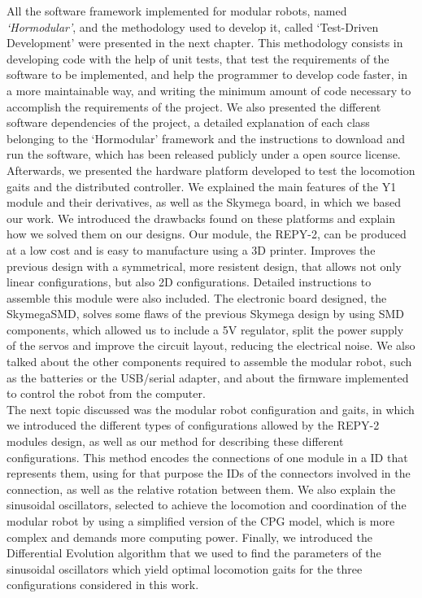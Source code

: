 All the software framework implemented for modular robots, named \emph{`Hormodular'}, and the methodology used to develop it, called `Test-Driven Development' were presented in the next chapter. This methodology consists in developing code with the help of unit tests, that test the requirements of the software to be implemented, and help the programmer to develop code faster, in a more maintainable way, and writing the minimum amount of code necessary to accomplish the requirements of the project. We also presented the different software dependencies of the project, a detailed explanation of each class belonging to the `Hormodular' framework and the instructions to download and run the software, which has been released publicly under a open source license.\\

Afterwards, we presented the hardware platform developed to test the locomotion gaits and the distributed controller. We explained the main features of the Y1 module and their derivatives, as well as the Skymega board, in which we based our work. We introduced the drawbacks found on these platforms and explain how we solved them on our designs. Our module, the REPY-2, can be produced at a low cost and is easy to manufacture using a 3D printer. Improves the previous design with a symmetrical, more resistent design, that allows not only linear configurations, but also 2D configurations. Detailed instructions to assemble this module were also included. The electronic board designed, the SkymegaSMD, solves some flaws of the previous Skymega design by using SMD components, which allowed us to include a 5V regulator, split the power supply of the servos and improve the circuit layout, reducing the electrical noise. We also talked about the other components required to assemble the modular robot, such as the batteries or the USB/serial adapter, and about the firmware implemented to control the robot from the computer.\\

The next topic discussed was the modular robot configuration and gaits, in which we introduced the different types of configurations allowed by the REPY-2 modules design, as well as our method for describing these different configurations. This 
method encodes the connections of one module in a ID that represents them, using for that purpose the IDs of the connectors involved in the connection, as well as the relative rotation between them. We also explain the sinusoidal oscillators, selected to achieve the locomotion and coordination of the modular robot by using a simplified version of the CPG model, which is more complex and demands more computing power. Finally, we introduced the Differential Evolution algorithm that we used to find the parameters of the sinusoidal oscillators which yield optimal locomotion gaits for the three configurations considered in this work.\\

